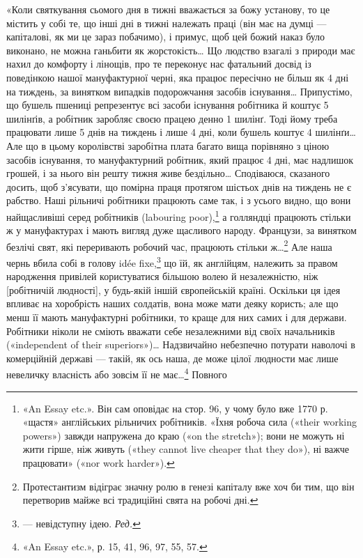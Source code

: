 «Коли святкування сьомого дня в тижні вважається за божу
установу, то це містить у собі те, що інші дні в тижні належать
праці (він має на думці — капіталові, як ми це зараз побачимо),
і примус, щоб цей божий наказ було виконано, не можна ганьбити
як жорстокість\dots{} Що людство взагалі з природи має нахил до
комфорту і лінощів, про те переконує нас фатальний досвід із
поведінкою нашої мануфактурної черні, яка працює пересічно
не більш як 4 дні на тиждень, за винятком випадків подорожчання
засобів існування\dots{} Припустімо, що бушель пшениці репрезентує
всі засоби існування робітника й коштує 5 шилінґів, а робітник
заробляє своєю працею денно 1 шилінґ. Тоді йому треба працювати
лише 5 днів на тиждень і лише 4 дні, коли бушель коштує
4 шилінґи\dots{} Але що в цьому королівстві заробітна плата багато
вища порівняно з ціною засобів існування, то мануфактурний
робітник, який працює 4 дні, має надлишок грошей, і за нього
він решту тижня живе бездільно\dots{} Сподіваюся, сказаного досить,
щоб з’ясувати, що помірна праця протягом шістьох днів на тиждень
не є рабство. Наші рільничі робітники працюють саме так,
і з усього видно, що вони найщасливіші серед робітників (labouring
poor),\footnote{
«An Essay etc.». Він сам оповідає на стор. 96, у чому було вже
1770 р. «щастя» англійських рільничих робітників. «Їхня робоча сила
(«their working powers») завжди напружена до краю («on the stretch»);
вони не можуть ні жити гірше, ніж живуть («they cannot live cheaper
that they do»), ні важче працювати» («nor work harder»).
} а голляндці працюють стільки ж у мануфактурах і мають
вигляд дуже щасливого народу. Французи, за винятком безлічі
свят, які переривають робочий час, працюють стільки ж\dots{}\footnote{
Протестантизм відіграє значну ролю в генезі капіталу вже хоч
би тим, що він перетворив майже всі традиційні свята на робочі дні.
}
Але наша чернь вбила собі в голову idée fixe,\footnote*{
— невідступну ідею. \emph{Ред.}
} що їй, як англійцям,
належить за правом народження привілей користуватися більшою
волею й незалежністю, ніж [робітничій людності], у будь-якій
іншій європейській країні. Оскільки ця ідея впливає на
хоробрість наших солдатів, вона може мати деяку користь; але
що менш її мають мануфактурні робітники, то краще для них
самих і для держави. Робітники ніколи не сміють вважати себе
незалежними від своїх начальників («independent of their superiors»)\dots{}
Надзвичайно небезпечно потурати наволочі в комерційній
державі — такій, як ось наша, де може  цілої людности
має лише невеличку власність або зовсім її не має\dots{}\footnote{
«An Essay etc.», р. 15, 41, 96, 97, 55, 57.
} Повного
